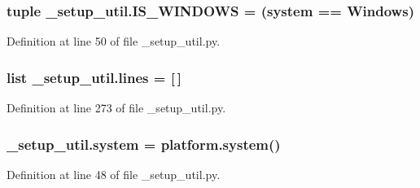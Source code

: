 \subsubsection[{\texorpdfstring{I\+S\+\_\+\+W\+I\+N\+D\+O\+WS}{IS_WINDOWS}}]{\setlength{\rightskip}{0pt plus 5cm}tuple \+\_\+setup\+\_\+util.\+I\+S\+\_\+\+W\+I\+N\+D\+O\+WS = ({\bf system} == \textquotesingle{}Windows\textquotesingle{})}\hypertarget{namespace__setup__util_a6fe69c2dbd92959b6651a28cbb846e6e}{}\label{namespace__setup__util_a6fe69c2dbd92959b6651a28cbb846e6e}


Definition at line 50 of file \+\_\+setup\+\_\+util.\+py.

\subsubsection[{\texorpdfstring{lines}{lines}}]{\setlength{\rightskip}{0pt plus 5cm}list \+\_\+setup\+\_\+util.\+lines = \mbox{[}$\,$\mbox{]}}\hypertarget{namespace__setup__util_a8618d8be5f729d4c9696daa5e083a001}{}\label{namespace__setup__util_a8618d8be5f729d4c9696daa5e083a001}


Definition at line 273 of file \+\_\+setup\+\_\+util.\+py.

\subsubsection[{\texorpdfstring{system}{system}}]{\setlength{\rightskip}{0pt plus 5cm}\+\_\+setup\+\_\+util.\+system = platform.\+system()}\hypertarget{namespace__setup__util_ae9fca6a80a6923f4580be72f68fee325}{}\label{namespace__setup__util_ae9fca6a80a6923f4580be72f68fee325}


Definition at line 48 of file \+\_\+setup\+\_\+util.\+py.

